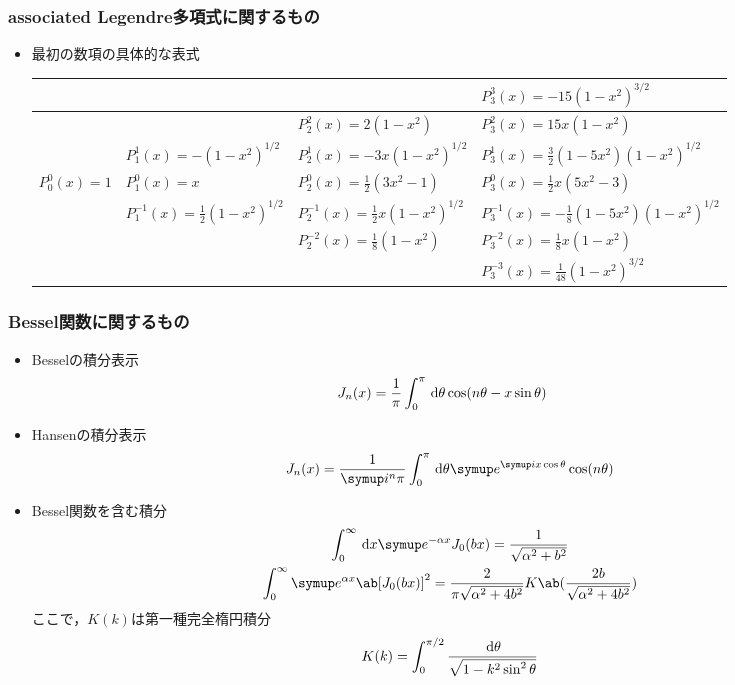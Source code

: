 \subsubsection{associated Legendre多項式に関するもの}
\begin{itemize}%
  \item 最初の数項の具体的な表式
    \begin{table}[H]%
      \centering%
      \begin{tabular}{|l|l|l|l|}  
        \hline
        & & & $P_3^3(x) = -15(1-x^2)^{3/2}$\\\hline
        & & $P_2^2(x) = 2(1-x^2)$& $P_3^2(x) = 15x(1-x^2)$\\\hline
        & $P_1^1(x) = -(1-x^2)^{1/2}$& $P_2^1(x) = -3x(1-x^2)^{1/2}$& $P_3^1(x) = \frac{3}{2}(1-5x^2)(1-x^2)^{1/2}$\\\hline
        $P_0^0(x) = 1$& $P_1^0(x) = x$& $P_2^0(x) = \frac{1}{2}(3x^2-1)$& $P_3^0(x) = \frac{1}{2}x(5x^2 - 3)$\\\hline
        & $P_1^{-1}(x) = \frac{1}{2}(1-x^2)^{1/2}$& $P_2^{-1}(x) = \frac{1}{2} x(1-x^2)^{1/2}$& $P_3^{-1}(x) = -\frac{1}{8} (1-5x^2)(1-x^2)^{1/2}$\\\hline
        & & $P_2^{-2}(x) = \frac{1}{8}(1-x^2)$& $P_3^{-2} (x) = \frac{1}{8} x (1-x^2)$\\\hline
        & & & $P_3^{-3} (x) = \frac{1}{48}(1-x^2)^{3/2}$\\\hline
      \end{tabular}%
    \end{table}%
\end{itemize}%

\subsubsection{Bessel関数に関するもの}
\begin{itemize}%
  \item Besselの積分表示
    \begin{align}
      J_n(x) &= \frac{1}{\pi} \int_0^\pi \dl{\theta \cos(n\theta - x \sin\theta)}
    \end{align}%
  \item Hansenの積分表示
    \begin{gather}%
      J_n(x) = \frac{1}{\i^n \pi} \int_0^\pi \dl{\theta} \e^{\i x\cos\theta} \cos(n\theta)
    \end{gather}%
  \item Bessel関数を含む積分
    \begin{gather}%
      \int_0^\infty \dl{x} \e^{-\alpha x} J_0(bx) = \frac{1}{\sqrt{\alpha^2 + b^2}}\\
      \int_0^\infty \e^{\alpha x} \ab[J_0(bx)]^2 =
      \frac{2}{\pi\sqrt{\alpha^2 + 4b^2}} K\ab(\frac{2b}{\sqrt{\alpha^2 + 4b^2}}) 
    \end{gather}%
    ここで，$K(k)$は第一種完全楕円積分
    \begin{gather}%
      K(k) = \int_0^{\pi/2} \frac{\dl{\theta}}{\sqrt{1-k^2\sin^2\theta}}
    \end{gather}%
\end{itemize}%

